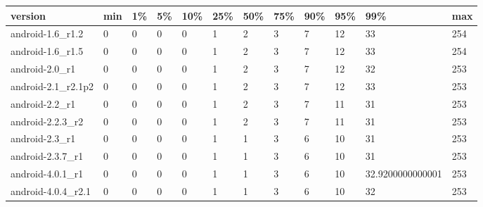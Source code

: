 \documentclass[a4paper]{article}
\begin{document}
\begin{tabular}{|l|l|l|l|l|l|l|l|l|l|l|l|}
\hline
version&min&1\%&5\%&10\%&25\%&50\%&75\%&90\%&95\%&99\%&max\\
\hline
android-1.6\_r1.2&0&0&0&0&1&2&3&7&12&33&254\\
\hline
android-1.6\_r1.5&0&0&0&0&1&2&3&7&12&33&254\\
\hline
android-2.0\_r1&0&0&0&0&1&2&3&7&12&32&253\\
\hline
android-2.1\_r2.1p2&0&0&0&0&1&2&3&7&12&33&253\\
\hline
android-2.2\_r1&0&0&0&0&1&2&3&7&11&31&253\\
\hline
android-2.2.3\_r2&0&0&0&0&1&2&3&7&11&31&253\\
\hline
android-2.3\_r1&0&0&0&0&1&1&3&6&10&31&253\\
\hline
android-2.3.7\_r1&0&0&0&0&1&1&3&6&10&31&253\\
\hline
android-4.0.1\_r1&0&0&0&0&1&1&3&6&10&32.9200000000001&253\\
\hline
android-4.0.4\_r2.1&0&0&0&0&1&1&3&6&10&32&253\\
\hline
\end{tabular}
\end{document}
